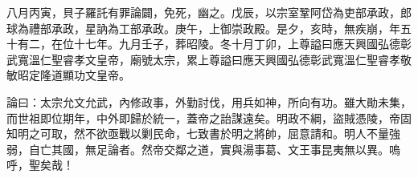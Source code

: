 \begin{pinyinscope}
八月丙寅，貝子羅託有罪論闢，免死，幽之。戊辰，以宗室鞏阿岱為吏部承政，郎球為禮部承政，星訥為工部承政。庚午，上御崇政殿。是夕，亥時，無疾崩，年五十有二，在位十七年。九月壬子，葬昭陵。冬十月丁卯，上尊謚曰應天興國弘德彰武寬溫仁聖睿孝文皇帝，廟號太宗，累上尊謚曰應天興國弘德彰武寬溫仁聖睿孝敬敏昭定隆道顯功文皇帝。

論曰：太宗允文允武，內修政事，外勤討伐，用兵如神，所向有功。雖大勛未集，而世祖即位期年，中外即歸於統一，蓋帝之詒謀遠矣。明政不綱，盜賊憑陵，帝固知明之可取，然不欲亟戰以剿民命，七致書於明之將帥，屈意請和。明人不量強弱，自亡其國，無足論者。然帝交鄰之道，實與湯事葛、文王事昆夷無以異。嗚呼，聖矣哉！


\end{pinyinscope}